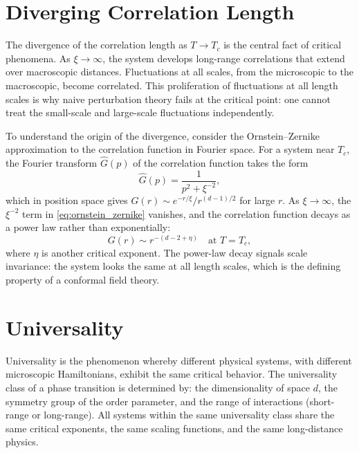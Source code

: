 \documentclass[11pt, twoside, openright]{book}
\theoremstyle{dotted}
\theoremstyle{definition}
\begin{document}
\section{Diverging Correlation Length}

The divergence of the correlation length as $T \to T_c$ is the central fact of
critical phenomena. As $\xi \to \infty$, the system develops long-range correlations
that extend over macroscopic distances. Fluctuations at all scales, from the
microscopic to the macroscopic, become correlated. This proliferation of
fluctuations at all length scales is why naive perturbation theory fails at the
critical point: one cannot treat the small-scale and large-scale fluctuations
independently.

To understand the origin of the divergence, consider the Ornstein--Zernike
approximation to the correlation function in Fourier space. For a system near
$T_c$, the Fourier transform $\hat G(p)$ of the correlation function takes the form
\begin{equation}
  \hat G(p) = \frac{1}{p^2 + \xi^{-2}},
  \label{eq:ornstein_zernike}
\end{equation}
which in position space gives $G(r) \sim e^{-r/\xi}/r^{(d-1)/2}$ for large $r$.
As $\xi \to \infty$, the $\xi^{-2}$ term in \eqref{eq:ornstein_zernike} vanishes,
and the correlation function decays as a power law rather than exponentially:
\begin{equation}
  G(r) \sim r^{-(d-2+\eta)} \quad \text{at } T = T_c,
  \label{eq:power_law_decay}
\end{equation}
where $\eta$ is another critical exponent. The power-law decay signals scale
invariance: the system looks the same at all length scales, which is the defining
property of a conformal field theory.

\section{Universality}

Universality is the phenomenon whereby different physical systems, with different
microscopic Hamiltonians, exhibit the same critical behavior. The universality class
of a phase transition is determined by: the dimensionality of space $d$, the
symmetry group of the order parameter, and the range of interactions (short-range
or long-range). All systems within the same universality class share the same
critical exponents, the same scaling functions, and the same long-distance physics.
\end{document}
